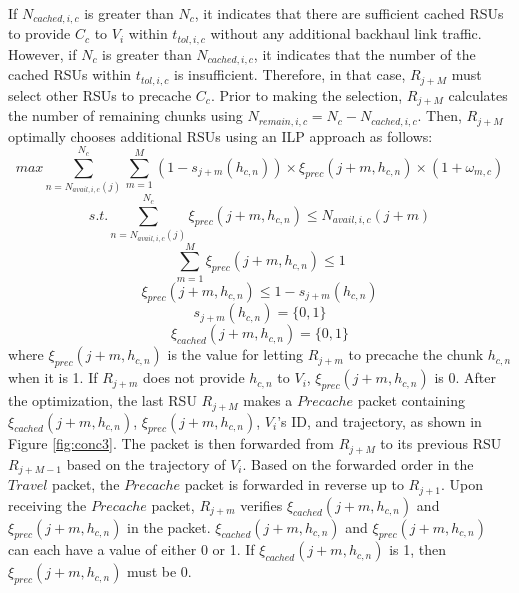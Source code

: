 \documentclass[journal]{IEEEtran}
\begin{document}
If $N_{cached, i, c}$ is greater than $N_{c}$, it indicates that there are sufficient cached RSUs to provide $C_{c}$ to $V_{i}$ within $t_{tol,i,c}$ without any additional backhaul link traffic.
However, if $N_{c}$ is greater than $N_{cached, i, c}$, it indicates that the number of the cached RSUs within $t_{tol,i,c}$ is insufficient.
Therefore, in that case, $R_{j+M}$ must select other RSUs to precache $C_{c}$.
Prior to making the selection, $R_{j+M}$ calculates the number of remaining chunks using $N_{remain,i,c}=N_{c}-N_{cached,i,c}$.
Then, $R_{j+M}$ optimally chooses additional RSUs using an ILP approach as follows:
\begin{equation}
    max \sum^{N_{c}}_{n=N_{avail,i,c}(j)}\sum^{M}_{m=1}(1-s_{j+m}(h_{c,n}))\times\xi_{prec}(j+m,h_{c,n})\times(1+\omega_{m,c})
\end{equation}
\begin{equation}
    s.t. \sum^{N_{c}}_{n=N_{avail,i,c}(j)}\xi_{prec}(j+m,h_{c,n})\leq N_{avail,i,c}(j+m)
\end{equation}
\begin{equation}
    \sum^{M}_{m=1}\xi_{prec}(j+m,h_{c,n})\leq 1
\end{equation}
\begin{equation}
    \xi_{prec}(j+m,h_{c,n})\leq1-s_{j+m}(h_{c,n})
\end{equation}
\begin{equation}
    s_{j+m}(h_{c,n})=\{0,1\}
\end{equation}
\begin{equation}
    \xi_{cached}(j+m,h_{c,n})=\{0,1\}
\end{equation}
where $\xi_{prec}(j+m,h_{c,n})$ is the value for letting $R_{j+m}$ to precache the chunk $h_{c,n}$ when it is 1.
If $R_{j+m}$ does not provide $h_{c,n}$ to $V_{i}$, $\xi_{prec}(j+m,h_{c,n})$ is 0.
After the optimization, the last RSU $R_{j+M}$ makes a $Precache$ packet containing $\xi_{cached}(j+m,h_{c,n})$, $\xi_{prec}(j+m,h_{c,n})$, $V_{i}$'s ID, and trajectory, as shown in Figure \ref{fig:conc3}.
The packet is then forwarded from $R_{j+M}$ to its previous RSU $R_{j+M-1}$ based on the trajectory of $V_{i}$.
Based on the forwarded order in the $Travel$ packet, the $Precache$ packet is forwarded in reverse up to $R_{j+1}$.
Upon receiving the $Precache$ packet, $R_{j+m}$ verifies $\xi_{cached}(j+m,h_{c,n})$ and $\xi_{prec}(j+m,h_{c,n})$ in the packet.
$\xi_{cached}(j+m,h_{c,n})$ and $\xi_{prec}(j+m,h_{c,n})$ can each have a value of either 0 or 1.
If $\xi_{cached}(j+m,h_{c,n})$ is 1, then $\xi_{prec}(j+m,h_{c,n})$ must be 0.
\end{document}
